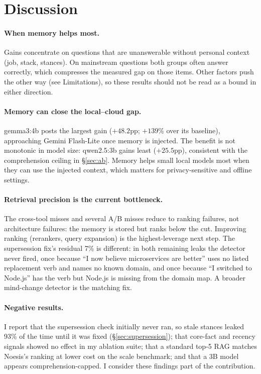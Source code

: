 \documentclass[11pt]{article}
\begin{document}
\section{Discussion}
\label{sec:discussion}

\paragraph{When memory helps most.} Gains concentrate on questions that
are unanswerable without personal context (job, stack, stances). On
mainstream questions both groups often answer correctly, which compresses
the measured gap on those items. Other factors push the other way (see
Limitations), so these results should not be read as a bound in either
direction.

\paragraph{Memory can close the local--cloud gap.} gemma3:4b posts the
largest gain ($+48.2$pp; $+139\%$ over its baseline), approaching Gemini
Flash-Lite once memory is injected. The benefit is not monotonic in model
size: qwen2.5:3b gains least ($+25.5$pp), consistent with the comprehension
ceiling in \S\ref{sec:ab}. Memory helps small local models most when they
can use the injected context, which matters for privacy-sensitive and
offline settings.

\paragraph{Retrieval precision is the current bottleneck.} The cross-tool
misses and several A/B misses reduce to ranking failures, not architecture
failures: the memory is stored but ranks below the cut. Improving ranking
(rerankers, query expansion) is the highest-leverage next step. The
supersession fix's residual 7\% is different: in both remaining leaks the
detector never fired, once because ``I now believe microservices are
better'' uses no listed replacement verb and names no known domain, and once
because ``I switched to Node.js'' has the verb but Node.js is missing from
the domain map. A broader mind-change detector is the matching fix.

\paragraph{Negative results.} I report that the supersession check
initially never ran, so stale stances leaked 93\% of the time until it was
fixed (\S\ref{sec:supersession}); that core-fact and recency signals showed
no effect in my ablation suite; that a standard top-5 RAG matches Noesis's
ranking at lower cost on the scale benchmark; and that a 3B model appears
comprehension-capped. I consider these findings part of the contribution.
\end{document}
